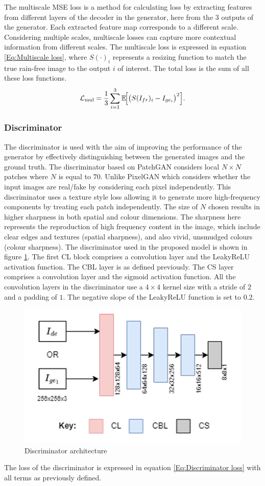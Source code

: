 \documentclass[11pt]{ociamthesis}  %
\begin{document}
The multiscale MSE loss\cite{qian2018attentive} is a method for calculating loss by extracting features from different layers of the decoder in the generator, here from the 3 outputs of the generator. Each extracted feature map corresponds to a different scale. Considering multiple scales, multiscale losses can capture more contextual information from different scales. The multiscale loss is expressed in equation \ref{Eq:Multiscale loss}, where $S(\cdot)_i$ represents a resizing function to match the true rain-free image to the output $i$ of interest. The total loss is the sum of all these loss functions.
\noindent
\begin{equation}
\mathcal{L}_{\text{mul}} = \frac{1}{3}\sum_{i=1}^{3} \mathbb{E}\!\Bigl[\bigl(S(I_{fr})_i - I_{{ge}{_i}}\bigr)^2\Bigr].
\label{Eq:Multiscale loss}
\end{equation}

\subsubsection{Discriminator}

The discriminator is used with the aim of improving the performance of the generator by effectively distinguishing between the generated images and the ground truth. The discriminator based on PatchGAN considers local $N \times N$ patches where $N$ is equal to $70$. Unlike PixelGAN which considers whether the input images are real/fake by considering each pixel independently. This discriminator uses a texture style loss allowing it to generate more high-frequency components by treating each patch independently. The size of $N$ chosen results in higher sharpness in both spatial and colour dimensions\cite{isola2017image}. The sharpness here represents the reproduction of high frequency content in the image, which include clear edges and textures (spatial sharpness), and also vivid, unsmudged colours (colour sharpness). The discriminator used in the proposed model is shown in figure \ref{fig:Discriminator architeture}. The first CL block comprises a convolution layer and the LeakyReLU activation function. The CBL layer is as defined previously. The CS layer comprises a convolution layer and the sigmoid activation function. All the convolution layers in the discriminator use a $4 \times 4$ kernel size with a stride of $2$ and a padding of $1$. The negative slope of the LeakyReLU function is set to $0.2$.
\begin{figure}
    \centering
    \includegraphics[width=0.3\linewidth]{figures/Kwon-et-al-Discriminator-Architecture.png}
    \caption{Discriminator architecture}
    \label{fig:Discriminator architeture}
\end{figure}
The loss of the discriminator is expressed in equation \ref{Eq:Discriminator loss} with all terms as previously defined.
\end{document}
